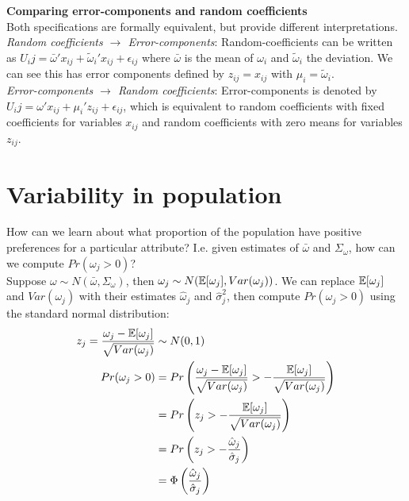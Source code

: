 \documentclass[DIV=14,titlepage=false]{scrreprt}
\begin{document}
\textbf{Comparing error-components and random coefficients}\\
Both specifications are formally equivalent, but provide different interpretations.\\
\textit{Random coefficients $\to$ Error-components}: Random-coefficients can be written as $U_ij = \bar \omega ' x_{ij} + \tilde \omega_i ' x_{ij} + \epsilon_{ij}$ where $\bar \omega$ is the mean of $\omega_i$ and $\tilde \omega_i$ the deviation. We can see this has error components defined by $z_{ij} = x_{ij}$ with $\mu_i = \tilde \omega_i$.\\
\textit{Error-components $\to$ Random coefficients}: Error-components is denoted by $U_ij = \omega ' x_{ij} + \mu_i ' z_{ij} + \epsilon_{ij}$, which is equivalent to random coefficients with fixed coefficients for variables $x_{ij}$ and random coefficients with zero means for variables $z_{ij}$. 
\section{Variability in population}
How can we learn about what proportion of the population have positive preferences for a particular attribute? I.e. given estimates of $\bar \omega$ and $\Sigma_\omega$, how can we compute $Pr(\omega_j > 0)$?\\
Suppose $\omega \sim N(\bar \omega, \Sigma_\omega)$, then $\omega_j \sim N(\mathbb{E}[\omega_j], Var(\omega_j))$. We can replace $\mathbb{E}[\omega_j]$ and $Var(\omega_j)$ with their estimates $\hat \omega_j$ and $\hat \sigma^2_j$, then compute $Pr(\omega_j > 0)$ using the standard normal distribution:
\begin{align*}
    z_j = \frac{\omega_j - \mathbb{E}[\omega_j]}{\sqrt{Var(\omega_j)}} & \sim N(0,1)\\
    Pr(\omega_j > 0) &= Pr\left(\frac{\omega_j - \mathbb{E}[\omega_j]}{\sqrt{Var(\omega_j)}} > -\frac{\mathbb{E}[\omega_j]}{\sqrt{Var(\omega_j)}}\right)\\
    &= Pr\left(z_j > -\frac{\mathbb{E}[\omega_j]}{\sqrt{Var(\omega_j)}}\right)\\
    &= Pr\left(z_j > -\frac{\hat \omega_j}{\hat \sigma_j}\right)\\
    &= \Phi \left(\frac{\hat \omega_j}{\hat \sigma_j}\right)
\end{align*}
\end{document}
